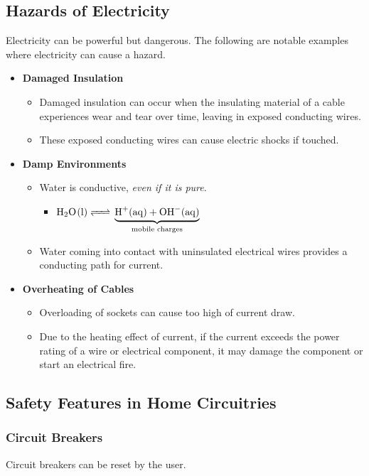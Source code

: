 \documentclass[../main.tex]{subfiles}
\begin{document}
	\subsection{Hazards of Electricity}
	Electricity can be powerful but dangerous. The following are notable examples where electricity can cause a hazard. 
	\begin{itemize}
		\item \textbf{Damaged Insulation} \begin{itemize}
			\item Damaged insulation can occur when the insulating material of a cable experiences wear and tear over time, leaving in exposed conducting wires.
			\item These exposed conducting wires can cause electric shocks if touched.
		\end{itemize}
		\item \textbf{Damp Environments} \begin{itemize}
			\item Water is conductive, \textit{even if it is pure}. \begin{itemize}
				\item \(\ce{H2O(l) <=>} \underbrace{\ce{H+(aq) + OH-(aq)}}_{\text{mobile charges}}\)
			\end{itemize}
			\item Water coming into contact with uninsulated electrical wires provides a conducting path for current.
		\end{itemize} 
		\item \textbf{Overheating of Cables} \begin{itemize}
			\item Overloading of sockets can cause too high of current draw.
			\item Due to the heating effect of current, if the current exceeds the power rating of a wire or electrical component, it may damage the component or start an electrical fire.
		\end{itemize}
	\end{itemize}

	\subsection{Safety Features in Home Circuitries}
	\subsubsection{Circuit Breakers}
	Circuit breakers can be reset by the user.
	
\end{document}
